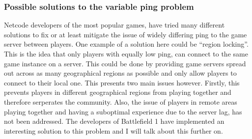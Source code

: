 \subsubsection{Possible solutions to the variable ping problem}
Netcode developers of the most popular games, have tried many different solutions to fix or at least mitigate the issue of widely differing ping to the game server between players. One example of a solution here could be ``region locking''. This is the idea that only players with equally low ping, can connect to the same game instance on a server. This could be done by providing game servers spread out across as many geographical regions as possible and only allow players to connect to their local one. This presents two main issues however. Firstly, this prevents players in different geographical regions from playing together and therefore serperates the community. Also, the issue of players in remote areas playing together and having a suboptimal experience due to the server lag, has not been addressed. The developers of Battlefield 1 have implemented an interesting solution to this problem and I will talk about this further on.
